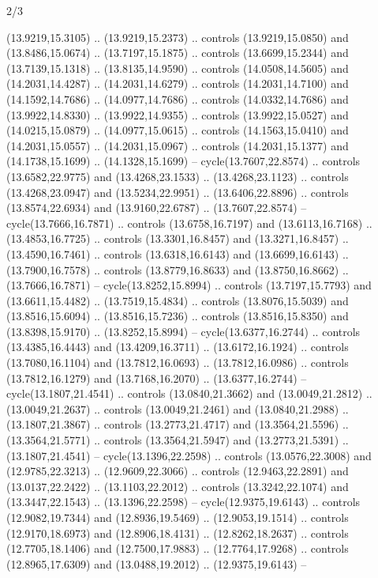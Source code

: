\begin{flagdescription}{2/3}
\begin{scope}[yshift=\flagwidth,scale=\flagwidth/1241.93737]
\begin{scope}[y=-1mm, x=1mm,draw=gold,fill=blue,line join=miter,miter limit=4,line width=1.8\lw]
{  (13.9219,15.3105) .. (13.9219,15.2373) .. controls (13.9219,15.0850) and
  (13.8486,15.0674) .. (13.7197,15.1875) .. controls (13.6699,15.2344) and
  (13.7139,15.1318) .. (13.8135,14.9590) .. controls (14.0508,14.5605) and
  (14.2031,14.4287) .. (14.2031,14.6279) .. controls (14.2031,14.7100) and
  (14.1592,14.7686) .. (14.0977,14.7686) .. controls (14.0332,14.7686) and
  (13.9922,14.8330) .. (13.9922,14.9355) .. controls (13.9922,15.0527) and
  (14.0215,15.0879) .. (14.0977,15.0615) .. controls (14.1563,15.0410) and
  (14.2031,15.0557) .. (14.2031,15.0967) .. controls (14.2031,15.1377) and
  (14.1738,15.1699) .. (14.1328,15.1699) -- cycle(13.7607,22.8574) .. controls
  (13.6582,22.9775) and (13.4268,23.1533) .. (13.4268,23.1123) .. controls
  (13.4268,23.0947) and (13.5234,22.9951) .. (13.6406,22.8896) .. controls
  (13.8574,22.6934) and (13.9160,22.6787) .. (13.7607,22.8574) --
  cycle(13.7666,16.7871) .. controls (13.6758,16.7197) and (13.6113,16.7168) ..
  (13.4853,16.7725) .. controls (13.3301,16.8457) and (13.3271,16.8457) ..
  (13.4590,16.7461) .. controls (13.6318,16.6143) and (13.6699,16.6143) ..
  (13.7900,16.7578) .. controls (13.8779,16.8633) and (13.8750,16.8662) ..
  (13.7666,16.7871) -- cycle(13.8252,15.8994) .. controls (13.7197,15.7793) and
  (13.6611,15.4482) .. (13.7519,15.4834) .. controls (13.8076,15.5039) and
  (13.8516,15.6094) .. (13.8516,15.7236) .. controls (13.8516,15.8350) and
  (13.8398,15.9170) .. (13.8252,15.8994) -- cycle(13.6377,16.2744) .. controls
  (13.4385,16.4443) and (13.4209,16.3711) .. (13.6172,16.1924) .. controls
  (13.7080,16.1104) and (13.7812,16.0693) .. (13.7812,16.0986) .. controls
  (13.7812,16.1279) and (13.7168,16.2070) .. (13.6377,16.2744) --
  cycle(13.1807,21.4541) .. controls (13.0840,21.3662) and (13.0049,21.2812) ..
  (13.0049,21.2637) .. controls (13.0049,21.2461) and (13.0840,21.2988) ..
  (13.1807,21.3867) .. controls (13.2773,21.4717) and (13.3564,21.5596) ..
  (13.3564,21.5771) .. controls (13.3564,21.5947) and (13.2773,21.5391) ..
  (13.1807,21.4541) -- cycle(13.1396,22.2598) .. controls (13.0576,22.3008) and
  (12.9785,22.3213) .. (12.9609,22.3066) .. controls (12.9463,22.2891) and
  (13.0137,22.2422) .. (13.1103,22.2012) .. controls (13.3242,22.1074) and
  (13.3447,22.1543) .. (13.1396,22.2598) -- cycle(12.9375,19.6143) .. controls
  (12.9082,19.7344) and (12.8936,19.5469) .. (12.9053,19.1514) .. controls
  (12.9170,18.6973) and (12.8906,18.4131) .. (12.8262,18.2637) .. controls
  (12.7705,18.1406) and (12.7500,17.9883) .. (12.7764,17.9268) .. controls
  (12.8965,17.6309) and (13.0488,19.2012) .. (12.9375,19.6143) --
}
\end{scope}
\end{scope}
\end{flagdescription}
